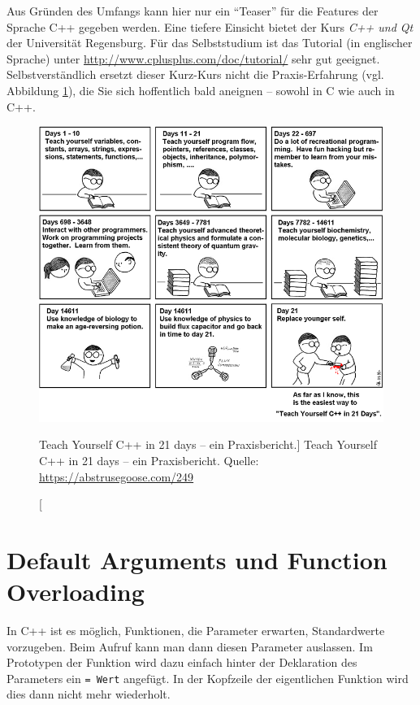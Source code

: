 Aus Gründen des Umfangs kann hier nur ein \enquote{Teaser} für die Features der Sprache C++ gegeben werden. Eine tiefere Einsicht bietet der Kurs \emph{C++ und Qt} der Universität Regensburg. Für das Selbststudium ist das Tutorial (in englischer Sprache) unter \url{http://www.cplusplus.com/doc/tutorial/} sehr gut geeignet. Selbstverständlich ersetzt dieser Kurz-Kurs nicht die Praxis-Erfahrung (vgl. Abbildung \ref{fig:gooseCPP}), die Sie sich hoffentlich bald aneignen -- sowohl in C wie auch in C++.

\begin{figure}
	\includegraphics[width=\linewidth]{./gfx/agoose-249}
	\caption
		[Teach Yourself C++ in 21 days -- ein Praxisbericht.]
		{Teach Yourself C++ in 21 days -- ein Praxisbericht.\newline 
		 Quelle: \url{https://abstrusegoose.com/249}}
	\label{fig:gooseCPP}
\end{figure}


\section{Default Arguments und Function Overloading}
In C++ ist es möglich, Funktionen, die Parameter erwarten, Standardwerte vorzugeben. Beim Aufruf kann man dann diesen Parameter auslassen. Im Prototypen der Funktion wird dazu einfach hinter der Deklaration des Parameters ein \texttt{= Wert} angefügt. In der Kopfzeile der eigentlichen Funktion wird dies dann nicht mehr wiederholt.

